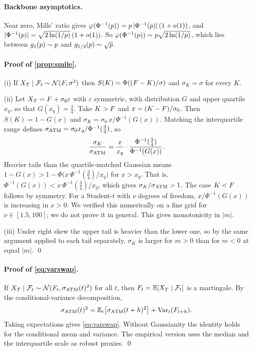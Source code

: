 \paragraph{Backbone asymptotics.} Near zero, Mills' ratio gives
$\varphi(\Phi^{-1}(p))=p\,|\Phi^{-1}(p)|\,(1+o(1))$, and
$|\Phi^{-1}(p)|=\sqrt{2\ln(1/p)}\,(1+o(1))$. So
$\varphi(\Phi^{-1}(p))\sim p\sqrt{2\ln(1/p)}$, which lies between $g_1(p)\sim p$ and
$g_{1/2}(p)\sim\sqrt{p}$.

\paragraph{Proof of \cref{prop:smile}.}
(i) If $X_T\mid\mathcal{F}_t\sim\mathcal{N}(F,\sigma^2)$ then $S(K)=\Phi((F-K)/\sigma)$ and $\sigma_K=\sigma$ for
every $K$.

(ii) Let $X_T=F+\sigma_0\varepsilon$ with $\varepsilon$ symmetric, with distribution $G$ and
upper quartile $x_q$, so that $G(x_q)=\tfrac34$. Take $K>F$ and $x=(K-F)/\sigma_0$. Then
$S(K)=1-G(x)$ and $\sigma_K=\sigma_0\,x/\Phi^{-1}(G(x))$. Matching the interquartile range defines
$\sigma_{\mathrm{ATM}}=\sigma_0x_q/\Phi^{-1}(\tfrac34)$, so
\[
  \frac{\sigma_K}{\sigma_{\mathrm{ATM}}}=\frac{x}{x_q}\cdot\frac{\Phi^{-1}(\tfrac34)}{\Phi^{-1}(G(x))}.
\]
Heavier tails than the quartile-matched Gaussian means
$1-G(x)>1-\Phi\big(x\,\Phi^{-1}(\tfrac34)/x_q\big)$ for $x>x_q$. That is,
$\Phi^{-1}(G(x))<x\,\Phi^{-1}(\tfrac34)/x_q$, which gives $\sigma_K/\sigma_{\mathrm{ATM}}>1$. The case $K<F$
follows by symmetry. For a Student-$t$ with $\nu$ degrees of freedom, $x/\Phi^{-1}(G(x))$ is
increasing in $x>0$. We verified this numerically on a fine grid for $\nu\in[1.5,100]$; we do not
prove it in general. This gives monotonicity in $|m|$.

(iii) Under right skew the upper tail is heavier than the lower one, so by the same argument
applied to each tail separately, $\sigma_K$ is larger for $m>0$ than for $m<0$ at equal $|m|$.
\qed

\paragraph{Proof of \eqref{eq:varswap}.}
If $X_T\mid\mathcal{F}_t\sim\mathcal{N}(F_t,\sigma_{\mathrm{ATM}}(t)^2)$ for all $t$, then $F_t=\mathbb{E}[X_T\mid\mathcal{F}_t]$ is a martingale.
By the conditional-variance decomposition,
\[
  \sigma_{\mathrm{ATM}}(t)^2=\mathbb{E}_t\big[\sigma_{\mathrm{ATM}}(t+h)^2\big]+\operatorname{Var}_t(F_{t+h}) .
\]
Taking expectations gives \eqref{eq:varswap}. Without Gaussianity the identity holds for the
conditional mean and variance. The empirical version uses the median and the interquartile scale
as robust proxies. \qed

